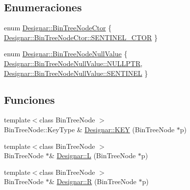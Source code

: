 \subsection*{Enumeraciones}
\begin{DoxyCompactItemize}
\item 
enum \hyperlink{namespace_designar_a679bc99fd69a3601faa5d6d47f865106}{Designar\+::\+Bin\+Tree\+Node\+Ctor} \{ \hyperlink{namespace_designar_a679bc99fd69a3601faa5d6d47f865106a4f4a7d253320785e63c000ed8d4e1b07}{Designar\+::\+Bin\+Tree\+Node\+Ctor\+::\+S\+E\+N\+T\+I\+N\+E\+L\+\_\+\+C\+T\+OR}
 \}
\item 
enum \hyperlink{namespace_designar_adc51778fc9415de368881abd254cca7c}{Designar\+::\+Bin\+Tree\+Node\+Null\+Value} \{ \hyperlink{namespace_designar_adc51778fc9415de368881abd254cca7cabf31abdbb1a298903e3a7f0edd0dcaf9}{Designar\+::\+Bin\+Tree\+Node\+Null\+Value\+::\+N\+U\+L\+L\+P\+TR}, 
\hyperlink{namespace_designar_adc51778fc9415de368881abd254cca7cae6e9f5d5d8fb4be11d981eba8db34c14}{Designar\+::\+Bin\+Tree\+Node\+Null\+Value\+::\+S\+E\+N\+T\+I\+N\+EL}
 \}
\end{DoxyCompactItemize}
\subsection*{Funciones}
\begin{DoxyCompactItemize}
\item 
{\footnotesize template$<$class Bin\+Tree\+Node $>$ }\\Bin\+Tree\+Node\+::\+Key\+Type \& \hyperlink{namespace_designar_a5270cb81375a915ab30d0948ef371264}{Designar\+::\+K\+EY} (Bin\+Tree\+Node $\ast$p)
\item 
{\footnotesize template$<$class Bin\+Tree\+Node $>$ }\\Bin\+Tree\+Node $\ast$\& \hyperlink{namespace_designar_aa11847bfbb36f5f6368a877524609016}{Designar\+::L} (Bin\+Tree\+Node $\ast$p)
\item 
{\footnotesize template$<$class Bin\+Tree\+Node $>$ }\\Bin\+Tree\+Node $\ast$\& \hyperlink{namespace_designar_ab60731964168f0fca0491dba6ded179b}{Designar\+::R} (Bin\+Tree\+Node $\ast$p)
\end{DoxyCompactItemize}
